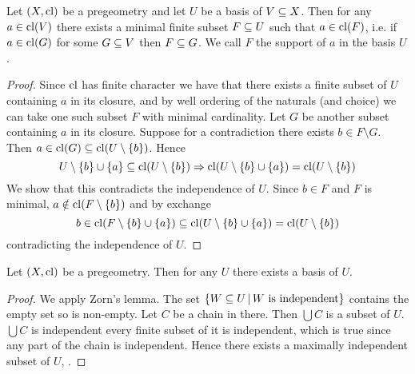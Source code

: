 \begin{lem}[Support]
    Let $(X,\operatorname{cl})$ be a pregeometry and let $U$ be a basis of $V \subseteq X$.
    Then for any $a \in \operatorname{cl}(V)$ there exists a minimal finite subset $F \subseteq U$
    such that $a \in \operatorname{cl}(F)$, 
    i.e. if $a \in \operatorname{cl}(G)$ for some $G \subseteq V$ then $F \subseteq G$.
    We call $F$ the support of $a$ in the basis $U$.
\end{lem}
\begin{proof}
    Since $\operatorname{cl}$ has finite character we have that there exists a finite subset 
    of $U$ containing $a$ in its closure, 
    and by well ordering of the naturals (and choice) we can take one such 
    subset $F$ with minimal cardinality.
    Let $G$ be another subset containing $a$ in its closure.
    Suppose for a contradiction there exists $b \in F \setminus G$.
    Then $a \in \operatorname{cl}(G) \subseteq \operatorname{cl}(U \setminus \left\{b\right\})$.
    Hence 
    \[
        U \setminus \left\{b\right\} \cup \left\{a\right\} \subseteq \operatorname{cl}(U \setminus \left\{b\right\})
        \Rightarrow 
        \operatorname{cl}(U \setminus \left\{b\right\} \cup \left\{a\right\}) = \operatorname{cl}(U \setminus \left\{b\right\})
    \]
    We show that this contradicts the independence of $U$.
    Since $b \in F$ and $F$ is minimal,
    $a \notin \operatorname{cl}(F \setminus \left\{b\right\})$ and by exchange 
    \[
        b \in \operatorname{cl}(F \setminus \left\{b\right\} \cup \left\{a\right\}) 
        \subseteq \operatorname{cl}(U \setminus \left\{b\right\} \cup \left\{a\right\}) 
        = \operatorname{cl}(U \setminus \left\{b\right\})
    \]
    contradicting the independence of $U$.
\end{proof}

\begin{prop}
    Let $(X,\operatorname{cl})$ be a pregeometry.
    Then for any $U$ there exists a basis of $U$.
\end{prop}
\begin{proof}
    We apply Zorn's lemma.
    The set $\left\{W \subseteq U \,|\, W \text{ is independent}\right\}$
    contains the empty set so is non-empty.
    Let $C$ be a chain in there.
    Then $\bigcup C$ is a subset of $U$.
    $\bigcup C$ is independent 
    every finite subset of it is independent, 
    which is true since any part of the chain is independent.
    Hence there exists a maximally independent subset of $U$,
    .
\end{proof}


